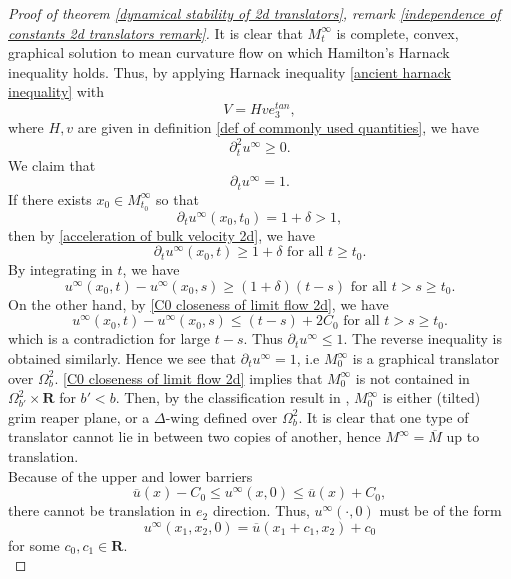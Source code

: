 \documentclass[pdflatex,sn-mathphys-num]{sn-jnl}%
\begin{document}
\begin{proof}[Proof of theorem \ref{dynamical stability of 2d translators}, remark \ref{independence of constants 2d translators remark}]
It is clear that $M^{\infty}_t$ is complete, convex, graphical solution to mean curvature flow on which Hamilton's Harnack inequality holds. Thus, by applying Harnack inequality \eqref{ancient harnack inequality} with 
\begin{equation}
    V = Hve_3^{tan},
\end{equation}
where $H,v$ are given in definition \ref{def of commonly used quantities}, we have
\begin{equation}\label{acceleration of bulk velocity 2d}
    \partial_t^2u^{\infty} \geq 0.
\end{equation}
We claim that 
\begin{equation}
\partial_tu^{\infty} = 1.    
\end{equation}
If there exists $x_0 \in M^{\infty}_{t_0}$ so that
\begin{equation}
    \partial_tu^{\infty}(x_0, t_0) = 1 + \delta > 1,
\end{equation}
then by \eqref{acceleration of bulk velocity 2d}, we have
\begin{equation}
    \partial_tu^{\infty}(x_0, t) \geq  1 + \delta \text{ for all }t \geq t_0.
\end{equation}
By integrating in $t$, we have
\begin{equation}
    u^{\infty}(x_0, t) - u^{\infty}(x_0, s) \geq (1 + \delta)(t - s) \text{ for all }t > s \geq t_0.
\end{equation}
On the other hand, by \eqref{C0 closeness of limit flow 2d}, we have
\begin{equation}
    u^{\infty}(x_0, t) - u^{\infty}(x_0, s) \leq (t - s)  +  2C_0\text{ for all }t > s \geq t_0.
\end{equation}
which is a contradiction for large $t - s$. Thus $\partial_tu^{\infty}\leq 1$. The reverse inequality is obtained similarly. Hence we see that $\partial_tu^{\infty} = 1$, i.e $M^{\infty}_0$ is a graphical translator over $\Omega^2_b$. \eqref{C0 closeness of limit flow 2d} implies that $M^{\infty}_0$ is not contained in $\Omega^2_{b'} \times \mathbf{R}$ for $b' < b$. Then, by the classification result in \cite{Hoffman2018GraphicalTF}, $M^{\infty}_0$ is either (tilted) grim reaper plane, or a $\Delta$-wing defined over $\Omega^2_b$. It is clear that one type of translator cannot lie in between two copies of another, hence $M^{\infty} = \overline{M}$ up to translation. \\

Because of the upper and lower barriers
\begin{equation}\label{c0 bound for limit flow in 2d translator case}
    \overline{u}(x) - C_0 \leq u^{\infty}(x, 0) \leq \overline{u}(x) + C_0,
\end{equation}
there cannot be translation in $e_2$ direction. Thus, $u^{\infty}(\cdot, 0)$ must be of the form
\begin{equation}
    u^{\infty}(x_1, x_2, 0) = \overline{u}(x_1 + c_1, x_2) + c_0
\end{equation}
for some $c_0, c_1 \in \mathbf{R}$. \\


\end{proof}
\end{document}
